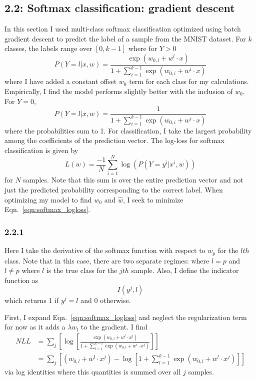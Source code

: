\documentclass[12pt]{amsart}
\begin{document}
\subsection*{2.2: Softmax classification: gradient descent}

In this section I used multi-class softmax classification optimized using batch gradient descent to predict the label of a sample from the MNIST dataset.  For $k$ classes, the labels range over $[0,k-1]$ where for $Y > 0$
\begin{equation} \label{eqn:softmax_p}
P(Y = l | x, w) = \frac{\exp{(w_{0,l} + w^l \cdot x)}}{1 + \sum_{i = 1}^{k-1}\exp{(w_{0,i} + w^i \cdot x)}}
\end{equation}
where I have added a constant offset $w_0$ term for each class for my calculations.  Empirically, I find the model performs slightly better with the inclusion of $w_0$.  For $Y = 0$,
\begin{equation}
P(Y = l | x, w) = \frac{1}{1 + \sum_{i = 1}^{k-1}\exp{(w_{0,i} + w^i \cdot x)}}
\end{equation}
where the probabilities sum to 1.  For classification, I take the largest probability among the coefficients of the prediction vector.  The log-loss for softmax classification is given by 
\begin{equation} \label{eqn:softmax_logloss}
L(w) = \frac{-1}{N} \sum_{i = 1}^N \log(P(Y = y^i | x^i, w))
\end{equation} 
for $N$ samples.  Note that this sum is over the entire prediction vector and not just the predicted probability corresponding to the correct label.  When optimizing my model to find $w_0$ and $\hat{w}$, I seek to minimize Eqn.~\ref{eqn:softmax_logloss}.


\subsubsection*{2.2.1}

Here I take the derivative of the softmax function with respect to $w_p$ for the $lth$ class.  Note that in this case, there are two separate regimes:  where $l = p$ and $l \neq p$ where $l$ is the true class for the $jth$ sample.  Also, I define the indicator function as
\begin{equation} \label{eqn:indicator}
I(y^j, l)
\end{equation}
which returns 1 if $y^j = l$ and 0 otherwise.

First, I expand Eqn.~\ref{eqn:softmax_logloss} and neglect the regularization term for now as it adds a $\lambda w_l$ to the gradient. I find 
\begin{equation} \label{eqn:softmax_logloss_exp}
\begin{split}
NLL & = \sum_j \left[ \log \left[  \frac{\exp{(w_{0,l} + w^l \cdot x^j)}}{1 + \sum_{l = 1}^{k-1}\exp{(w_{0,l} + w^i \cdot x^j)}} \right]\right] \\
& = \sum_j \left[(w_{0,l} + w^l \cdot x^j) - \log[1 + \sum_{l = 1}^{k-1}\exp{(w_{0,l} + w^l \cdot x^j)}] \right]
\end{split}
\end{equation}
via log identities where this quantities is summed over all $j$ samples.
\end{document}

